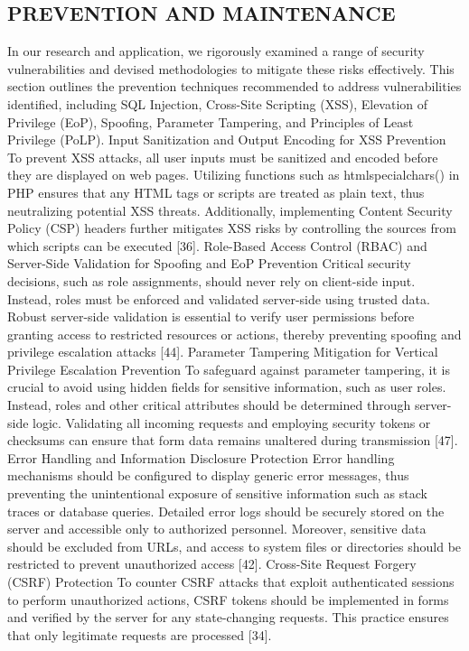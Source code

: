 \documentclass[letterpaper,twocolumn]{article}
\begin{document}
\subsection{PREVENTION AND MAINTENANCE}
In our research and application, we rigorously examined a range of security vulnerabilities and devised methodologies to mitigate these risks effectively. This section outlines the prevention techniques recommended to address vulnerabilities identified, including SQL Injection, Cross-Site Scripting (XSS), Elevation of Privilege (EoP), Spoofing, Parameter Tampering, and Principles of Least Privilege (PoLP).
Input Sanitization and Output Encoding for XSS Prevention
To prevent XSS attacks, all user inputs must be sanitized and encoded before they are displayed on web pages. Utilizing functions such as htmlspecialchars() in PHP ensures that any HTML tags or scripts are treated as plain text, thus neutralizing potential XSS threats. Additionally, implementing Content Security Policy (CSP) headers further mitigates XSS risks by controlling the sources from which scripts can be executed [36].
Role-Based Access Control (RBAC) and Server-Side Validation for Spoofing and EoP Prevention
Critical security decisions, such as role assignments, should never rely on client-side input. Instead, roles must be enforced and validated server-side using trusted data. Robust server-side validation is essential to verify user permissions before granting access to restricted resources or actions, thereby preventing spoofing and privilege escalation attacks [44].
Parameter Tampering Mitigation for Vertical Privilege Escalation Prevention
To safeguard against parameter tampering, it is crucial to avoid using hidden fields for sensitive information, such as user roles. Instead, roles and other critical attributes should be determined through server-side logic. Validating all incoming requests and employing security tokens or checksums can ensure that form data remains unaltered during transmission [47].
Error Handling and Information Disclosure Protection
Error handling mechanisms should be configured to display generic error messages, thus preventing the unintentional exposure of sensitive information such as stack traces or database queries. Detailed error logs should be securely stored on the server and accessible only to authorized personnel. Moreover, sensitive data should be excluded from URLs, and access to system files or directories should be restricted to prevent unauthorized access [42].
Cross-Site Request Forgery (CSRF) Protection
To counter CSRF attacks that exploit authenticated sessions to perform unauthorized actions, CSRF tokens should be implemented in forms and verified by the server for any state-changing requests. This practice ensures that only legitimate requests are processed [34].
\end{document}
